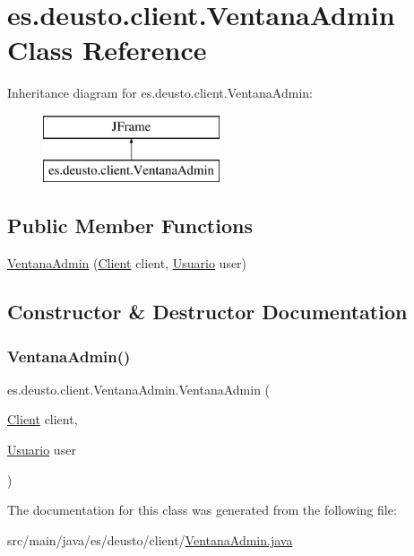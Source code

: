 \hypertarget{classes_1_1deusto_1_1client_1_1_ventana_admin}{}\section{es.\+deusto.\+client.\+Ventana\+Admin Class Reference}
\label{classes_1_1deusto_1_1client_1_1_ventana_admin}
Inheritance diagram for es.\+deusto.\+client.\+Ventana\+Admin\+:\begin{figure}[H]
\begin{center}
\leavevmode
\includegraphics[height=2.000000cm]{classes_1_1deusto_1_1client_1_1_ventana_admin}
\end{center}
\end{figure}
\subsection*{Public Member Functions}
\begin{DoxyCompactItemize}
\item 
\mbox{\hyperlink{classes_1_1deusto_1_1client_1_1_ventana_admin_a227953608a252f1fc239c3392163f3f4}{Ventana\+Admin}} (\mbox{\hyperlink{classes_1_1deusto_1_1client_1_1_client}{Client}} client, \mbox{\hyperlink{classes_1_1deusto_1_1server_1_1jdo_1_1_usuario}{Usuario}} user)
\end{DoxyCompactItemize}


\subsection{Constructor \& Destructor Documentation}
\mbox{\label{classes_1_1deusto_1_1client_1_1_ventana_admin_a227953608a252f1fc239c3392163f3f4}} 
\subsubsection{\texorpdfstring{VentanaAdmin()}{VentanaAdmin()}}
{\footnotesize\ttfamily es.\+deusto.\+client.\+Ventana\+Admin.\+Ventana\+Admin (\begin{DoxyParamCaption}\item[{\mbox{\hyperlink{classes_1_1deusto_1_1client_1_1_client}{Client}}}]{client,  }\item[{\mbox{\hyperlink{classes_1_1deusto_1_1server_1_1jdo_1_1_usuario}{Usuario}}}]{user }\end{DoxyParamCaption})}



The documentation for this class was generated from the following file\+:\begin{DoxyCompactItemize}
\item 
src/main/java/es/deusto/client/\mbox{\hyperlink{_ventana_admin_8java}{Ventana\+Admin.\+java}}\end{DoxyCompactItemize}
